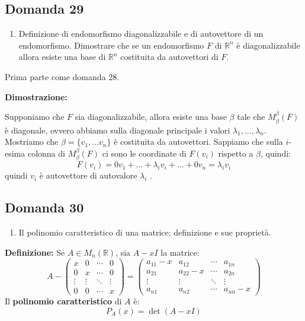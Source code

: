 \documentclass[
  a4paper,
]{article}
\providecommand{\tightlist}{%
  \setlength{\itemsep}{0pt}\setlength{\parskip}{0pt}}
\providecommand{\tightlist}{}
\begin{document}
\hypertarget{domanda-29}{%
\subsection{Domanda 29}\label{domanda-29}}

\begin{observationbox}[Domanda]
\begin{enumerate}
\def\labelenumi{\arabic{enumi}.}
\setcounter{enumi}{28}
\tightlist
\item
  Definizione di endomorfismo diagonalizzabile e di autovettore di un
  endomorfismo. Dimostrare che se un endomorfismo \(F\) di
  \(\mathbb{R}^n\) è diagonalizzabile allora esiste una base di
  \(\mathbb{R}^n\) costituita da autovettori di \(F\).
\end{enumerate}
\end{observationbox}

Prima parte come domanda 28.

\textbf{Dimostrazione:}

Supponiamo che \(F\) sia diagonalizzabile, allora esiste una base
\(\beta\) tale che \(M^{{\beta}}_{\beta}(F)\) è diagonale, ovvero
abbiamo sulla diagonale principale i valori
\(\lambda_1, ..., \lambda_n\). Mostriamo che \(\beta = \{v_1, ...v_n\}\)
è costituita da autovettori. Sappiamo che sulla \(i\)-esima colonna di
\(M^{{\beta}}_{\beta}(F)\) ci sono le coordinate di \(F(v_i)\) rispetto
a \(\beta\), quindi: \[
F(v_i) = 0 v_1 + ... + \lambda_i v_i + ... + 0 v_n = \lambda_i v_i
\] quindi \(v_i\) è autovettore di autovalore \(\lambda_i\) .

\hypertarget{domanda-30}{%
\subsection{Domanda 30}\label{domanda-30}}

\begin{observationbox}[Domanda]
\begin{enumerate}
\def\labelenumi{\arabic{enumi}.}
\setcounter{enumi}{29}
\tightlist
\item
  Il polinomio caratteristico di una matrice: definizione e sue
  proprietà.
\end{enumerate}
\end{observationbox}

\textbf{Definizione:} Se \(A \in M_n(\mathbb{R})\), sia \(A - xI\) la
matrice: \[
A -
\begin{pmatrix}
x & 0 & \cdots & 0\\
0 & x & \cdots & 0\\
\vdots & \vdots & \ddots & \vdots\\
0 & 0 & \cdots & x
\end{pmatrix}
= 
\begin{pmatrix}
a_{11}-x & a_{12} & \cdots & a_{1n}\\
a_{21} & a_{22}-x & \cdots & a_{2n}\\
\vdots & \vdots & \ddots & \vdots\\
a_{n1} & a_{n2} & \cdots & a_{nn}-x
\end{pmatrix}
\] Il \textbf{polinomio caratteristico} di \(A\) è: \[
P_A(x) = \det(A - xI)
\]
\end{document}
